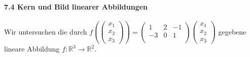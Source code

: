 \documentclass{scrreprt}
\begin{document}
\paragraph{7.4 Kern und Bild linearer Abbildungen}\phantom{\null}

Wir untersuchen die durch $f(\begin{pmatrix} x_1 \\ x_2 \\ x_3 \end{pmatrix}) =
\begin{pmatrix}
  1  & 2 & -1 \\
  -3 & 0 & 1  \\
\end{pmatrix} \begin{pmatrix} x_1 \\ x_2 \\ x_3 \end{pmatrix}$ gegebene lineare
Abbildung $f \colon \mathbb{R}^3 \to \mathbb{R}^2$.
\end{document}

